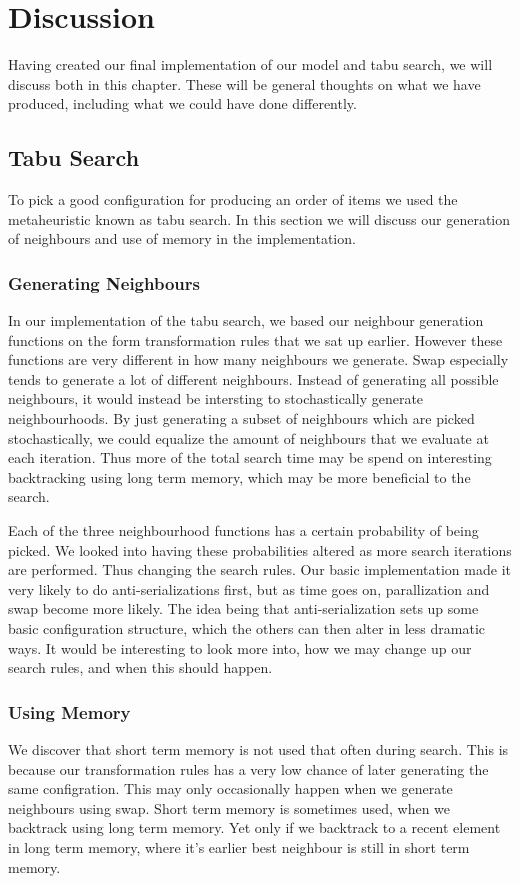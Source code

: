 \chapter{Discussion}\label{ch:discussion}
Having created our final implementation of our model and tabu search, we will discuss both in this chapter. These will be general thoughts on what we have produced, including what we could have done differently.



\section{Tabu Search}
To pick a good configuration for producing an order of items we used the metaheuristic known as tabu search. In this section we will discuss our generation of neighbours and use of memory in the implementation.

\subsection{Generating Neighbours}
In our implementation of the tabu search, we based our neighbour generation functions on the form transformation rules that we sat up earlier. However these functions are very different in how many neighbours we generate. Swap especially tends to generate a lot of different neighbours. Instead of generating all possible neighbours, it would instead be intersting to stochastically generate neighbourhoods. By just generating a subset of neighbours which are picked stochastically, we could equalize the  amount of neighbours that we evaluate at each iteration. Thus more of the total search time may be spend on interesting backtracking using long term memory, which may be more beneficial to the search.

Each of the three neighbourhood functions has a certain probability of being picked. We looked into having these probabilities altered as more search iterations are performed. Thus changing the search rules. Our basic implementation made it very likely to do anti-serializations first, but as time goes on, parallization and swap become more likely. The idea being that anti-serialization sets up some basic configuration structure, which the others can then alter in less dramatic ways. It would be interesting to look more into, how we may change up our search rules, and when this should happen.

\subsection{Using Memory}
We discover that short term memory is not used that often during search. This is because our transformation rules has a very low chance of later generating the same configration. This may only occasionally happen when we generate neighbours using swap. Short term memory is sometimes used, when we backtrack using long term memory. Yet only if we backtrack to a recent element in long term memory, where it's earlier best neighbour is still in short term memory.

